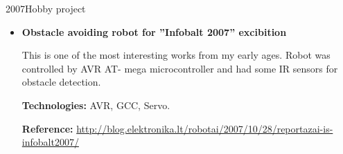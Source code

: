 \documentclass[12]{article}
\begin{document}
\hobbyproject
{2007}{Hobby project}
\begin{itemize}[leftmargin=2cm,topsep=-0.5cm]

\item \textbf{Obstacle avoiding robot for ”Infobalt 2007” excibition}

This is one of the most interesting works from my early ages. Robot was controlled by AVR AT-
mega microcontroller and had some IR sensors for obstacle detection.

\rule{0mm}{5mm}\textbf{Technologies:} AVR, GCC, Servo.

\rule{0mm}{5mm}\textbf{Reference:} \url{http://blog.elektronika.lt/robotai/2007/10/28/reportazai-is-infobalt2007/}\\

\end{itemize}
\end{document}
